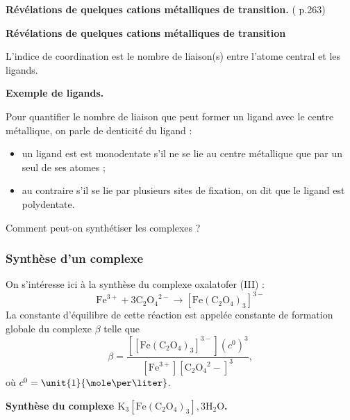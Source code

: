 \begin{experience}
\textbf{Révélations de quelques cations métalliques de transition.}
(\cite{Buchere2017} p.263)
\end{experience}

\begin{slide}
\textbf{Révélations de quelques cations métalliques de transition}
\end{slide}

L'indice de coordination est le nombre de liaison(s) entre l'atome central et les ligands.

\begin{slide}
\textbf{Exemple de ligands.}
\end{slide}

Pour quantifier le nombre de liaison que peut former un ligand avec le centre métallique, on parle de denticité du ligand :
\begin{itemize}
\item un ligand est est monodentate s'il ne se lie au centre métallique que par un seul de ses atomes ;
\item au contraire s'il se lie par plusieurs sites de fixation, on dit que le ligand est polydentate.
\end{itemize}

\begin{transition}
Comment peut-on synthétiser les complexes ?
\end{transition}

\subsubsection{Synthèse d'un complexe}

On s'intéresse ici à la synthèse du complexe oxalatofer (III) :
\begin{equation*}
\mathrm{Fe}^{3+} + 3 \mathrm{C_2O_4}^{2-} \rightarrow \mathrm{[Fe(C_2O_4)_3]}^{3-}
\end{equation*}
La constante d'équilibre de cette réaction est appelée constante de formation globale du complexe $\beta$ telle que
\begin{equation*}
\beta = \frac{[\mathrm{[Fe(C_2O_4)_3]}^{3-}](c^0)^3}{[\mathrm{Fe}^{3+}][\mathrm{C_2O_4}^2-]^3},
\end{equation*}
où $c^0 = \unit{1}{\mole\per\liter}$.

\begin{experience}
\textbf{Synthèse du complexe $\mathrm{K_3[Fe(C_2O_4)_3],3H_2O}$.}
\end{experience}

